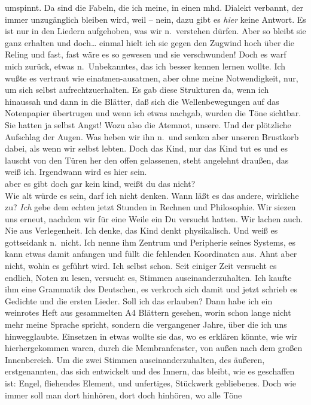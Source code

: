 \documentclass[
]{article}
\begin{document}
umspinnt. Da sind die Fabeln, die ich meine, in einen mhd. Dialekt
verbannt, der immer unzugänglich bleiben wird, weil -- nein, dazu gibt
es \emph{hier} keine Antwort. Es ist nur in den Liedern aufgehoben, was
wir n.~verstehen dürfen. Aber so bleibt sie ganz erhalten und
doch\ldots{} einmal hielt ich sie gegen den Zugwind hoch über die Reling
und fast, fast wäre es so gewesen und sie verschwunden! Doch es warf
mich zurück, etwas n.~Unbekanntes, das ich besser kennen lernen wollte.
Ich wußte es vertraut wie einatmen-ausatmen, aber ohne meine
Notwendigkeit, nur, um sich selbst aufrechtzuerhalten. Es gab diese
Strukturen da, wenn ich hinaussah und dann in die Blätter, daß sich die
Wellenbewegungen auf das Notenpapier übertrugen und wenn ich etwas
nachgab, wurden die Töne sichtbar. Sie hatten ja selbst Angst! Wozu also
die Atemnot, unsere. Und der plötzliche Aufschlag der Augen. Was heben
wir ihn n.~und senken aber unseren Brustkorb dabei, als wenn wir selbst
lebten. Doch das Kind, nur das Kind tut es und es lauscht von den Türen
her den offen gelassenen, steht angelehnt draußen, das weiß ich.
Irgendwann wird es hier sein.\\
aber es gibt doch gar kein kind, weißt du das nicht?\\
Wie alt würde es sein, darf ich nicht denken. Wann läßt es das andere,
wirkliche zu? \emph{Ich }gebe dem echten jetzt Stunden in Rechnen und
Philosophie. Wir siezen uns erneut, nachdem wir für eine Weile ein Du
versucht hatten. Wir lachen auch. Nie aus Verlegenheit. Ich denke, das
Kind denkt physikalisch. Und weiß es gottseidank n.~nicht. Ich nenne ihm
Zentrum und Peripherie seines Systems, es kann etwas damit anfangen und
füllt die fehlenden Koordinaten aus. Ahnt aber nicht, wohin es geführt
wird. Ich selbst schon. Seit einiger Zeit versucht es endlich, Noten zu
lesen, versucht es, Stimmen auseinanderzuhalten. Ich kaufte ihm eine
Grammatik des Deutschen, es verkroch sich damit und jetzt schrieb es
Gedichte und die ersten Lieder. Soll ich das erlauben? Dann habe ich ein
weinrotes Heft aus gesammelten A4 Blättern gesehen, worin schon lange
nicht mehr meine Sprache spricht, sondern die vergangener Jahre, über
die ich uns hinwegglaubte. Einsetzen in etwas wollte sie das, wo es
erklären könnte, wie wir hierhergekommen waren, durch die
Membranfenster, von außen nach dem großen Innenbereich. Um die zwei
Stimmen auseinanderzuhalten, des äußeren, erstgenannten, das sich
entwickelt und des Innern, das bleibt, wie es geschaffen ist: Engel,
fliehendes Element, und unfertiges, Stückwerk gebliebenes. Doch wie
immer soll man dort hinhören, dort doch hinhören, wo alle Töne
\end{document}
